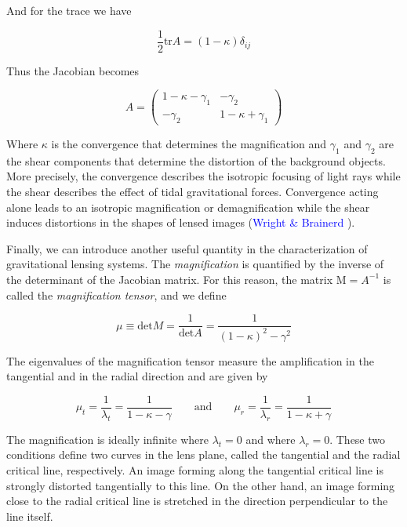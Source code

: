 And for the trace we have

\begin{equation}
\frac{1}{2}\text{tr}A=(1-\kappa)\delta_{ij}
\end{equation}

Thus the Jacobian becomes 

\begin{equation}
A= \left(\begin{array}{cc}
1-\kappa-\gamma_{1} & -\gamma_{2}\\
-\gamma_{2} & 1-\kappa+\gamma_{1}
\end{array}\right)
\end{equation}

Where $\kappa$ is the convergence that determines the magnification and $\gamma_{1}$ and $\gamma_{2}$ are the shear components that determine the distortion of the background objects. More precisely, the convergence describes the isotropic focusing of light rays while the shear describes the effect of tidal gravitational forces. Convergence acting alone leads to an isotropic magnification or demagnification while the shear induces distortions in the shapes of lensed images (\textcolor{blue}{Wright \& Brainerd} \citeyear{Reference4}). 

Finally, we can introduce another useful quantity in the characterization of gravitational lensing systems. The \textit{magnification} is quantified by the inverse of the determinant of the Jacobian matrix. For this reason, the matrix $\text{M}=A^{-1}$ is called the \textit{magnification tensor}, and we define

\begin{equation}
\mu \equiv \text{det} M = \frac{1}{\text{det}A}=\frac{1}{(1-\kappa)^2-\gamma^2}
\end{equation}

The eigenvalues of the magnification tensor measure the amplification in the tangential and in the radial direction and are given by

\begin{equation}
\mu_t = \frac{1}{\lambda_t}=\frac{1}{1-\kappa - \gamma} \qquad \text{and} \qquad  \mu_r = \frac{1}{\lambda_r}=\frac{1}{1-\kappa + \gamma}
\end{equation}

The magnification is ideally infinite where $\lambda_t=0$ and where $\lambda_r=0$. These two conditions define two curves in the lens plane, called the tangential and the radial critical line, respectively. An image forming along the tangential critical line is strongly distorted tangentially to this line. On the other hand, an image forming close to the radial critical line is stretched in the direction perpendicular to the line itself. 

